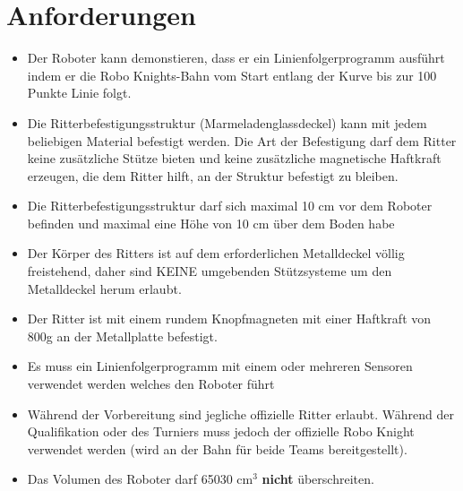 \documentclass[a4paper,12pt]{article}
\begin{document}
\section{Anforderungen}
\robotRequirements
\begin{itemize}
	\item Der Roboter kann demonstieren, dass er ein Linienfolgerprogramm
		ausführt indem er die Robo Knights-Bahn vom Start entlang der
		Kurve bis zur 100 Punkte Linie folgt.
	\item Die Ritterbefestigungsstruktur (Marmeladenglassdeckel) kann mit
		jedem beliebigen Material befestigt werden. Die Art der
		Befestigung darf dem Ritter keine zusätzliche Stütze bieten und
		keine zusätzliche magnetische Haftkraft erzeugen, die dem
		Ritter hilft, an der Struktur befestigt zu bleiben.
	\item Die Ritterbefestigungsstruktur darf sich maximal 10 cm vor dem
		Roboter befinden und maximal eine Höhe von 10 cm über dem Boden
		habe
	\item Der Körper des Ritters ist auf dem erforderlichen Metalldeckel
		völlig freistehend, daher sind KEINE umgebenden Stützsysteme um
		den Metalldeckel herum erlaubt.
	\item Der Ritter ist mit einem rundem Knopfmagneten mit einer Haftkraft
		von 800g an der Metallplatte befestigt.
	\item Es muss ein Linienfolgerprogramm mit einem oder mehreren Sensoren
		verwendet werden welches den Roboter führt
	\item Während der Vorbereitung sind jegliche offizielle Ritter erlaubt.
		Während der Qualifikation oder des Turniers muss jedoch der
		offizielle Robo Knight verwendet werden (wird an der
		Bahn für beide Teams bereitgestellt).
	\item Das Volumen des Roboter darf 65030 cm$^{3}$ \textbf{nicht}
		überschreiten.
\end{itemize}
\end{document}
